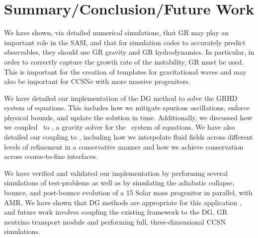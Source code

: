 \chapter{Summary/Conclusion/Future Work}

We have shown, via detailed numerical simulations, that GR may play an
important role in  the SASI, and that for simulation codes to
accurately predict observables, they should use GR gravity and GR hydrodynamics.
In particular, in order to correctly capture the growth rate of the
instability, GR must be used.  
This is important for the creation of templates for gravitational waves
and may also be important for CCSNe with more massive progenitors.

We have detailed our implementation of the DG method to solve the GRHD
system of equations.
This includes how we mitigate spurious oscillations,
enforce physical bounds, and update the solution in time.
Additionally, we discussed how we coupled \thornado\ to \poseidon,
a gravity solver for the \xcfc\ system of equations.
We have also detailed our coupling to \amrex, including how we interpolate
fluid fields across different levels of refinement in a conservative manner
and how we achieve conservation across coarse-to-fine interfaces.

We have verified and validated  our implementation by performing several
simulations of test-problems as well as by simulating the adiabatic collapse,
bounce, and
post-bounce evolution of a 15 Solar mass progenitor in parallel, with AMR.
We have shown that DG methods are appropriate for this application ,
and future work involves coupling the existing framework to the DG, GR
neutrino transport module and performing full, three-dimensional
CCSN simulations.

